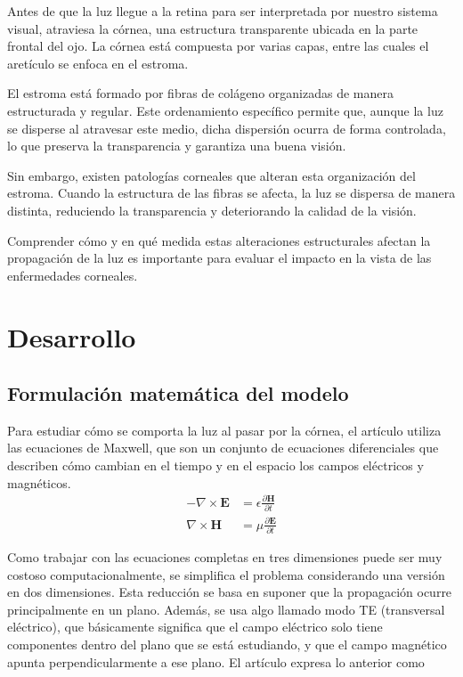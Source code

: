 \documentclass[10pt,a4paper]{article}
\begin{document}
Antes de que la luz llegue a la retina para ser interpretada por nuestro sistema visual, atraviesa la córnea, una estructura transparente ubicada en la parte frontal del ojo. La córnea está compuesta por varias capas, entre las cuales el aretículo se enfoca en el estroma.

El estroma está formado por fibras de colágeno organizadas de manera estructurada y regular. Este ordenamiento específico permite que, aunque la luz se disperse al atravesar este medio, dicha dispersión ocurra de forma controlada, lo que preserva la transparencia y garantiza una buena visión.

Sin embargo, existen patologías corneales que alteran esta organización del estroma. Cuando la estructura de las fibras se afecta, la luz se dispersa de manera distinta, reduciendo la transparencia y deteriorando la calidad de la visión.

Comprender cómo y en qué medida estas alteraciones estructurales afectan la propagación de la luz es importante para evaluar el impacto en la vista de las enfermedades corneales.

\newpage


\section{Desarrollo}
\subsection{Formulación matemática del modelo}

Para estudiar cómo se comporta la luz al pasar por la córnea, el artículo utiliza las ecuaciones de Maxwell, que son un conjunto de ecuaciones diferenciales que describen cómo cambian en el tiempo y en el espacio los campos eléctricos y magnéticos. 
\[
\begin{aligned}
- \nabla \times \mathbf{E} &= \epsilon \frac{\partial \mathbf{H}}{\partial t} \\
\nabla \times \mathbf{H} &= \mu \frac{\partial \mathbf{E}}{\partial t}
\end{aligned}
\]

Como trabajar con las ecuaciones completas en tres dimensiones puede ser muy costoso computacionalmente, se simplifica el problema considerando una versión en dos dimensiones. Esta reducción se basa en suponer que la propagación ocurre principalmente en un plano. Además, se usa algo llamado modo TE (transversal eléctrico), que básicamente significa que el campo eléctrico solo tiene componentes dentro del plano que se está estudiando, y que el campo magnético apunta perpendicularmente a ese plano. El artículo expresa lo anterior como 
\end{document}
